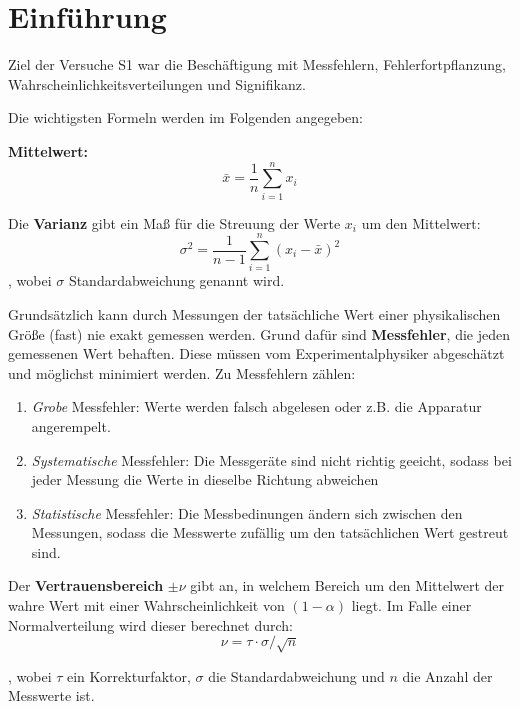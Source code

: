 \section{Einführung}

Ziel der Versuche S1 war die Beschäftigung mit Messfehlern, Fehlerfortpflanzung, Wahrscheinlichkeitsverteilungen und Signifikanz.

Die wichtigsten Formeln werden im Folgenden angegeben:

\textbf{Mittelwert:}
\begin{equation}
  \bar{x}=\frac{1}{n} \sum_{i=1}^n x_i
  \label{mwert}
\end{equation}

Die \textbf{Varianz} gibt ein Maß für die Streuung der Werte $x_i$ um den Mittelwert:
\begin{equation}
  \sigma^2=\frac{1}{n-1} \sum_{i=1}^n (x_i-\bar{x})^2
  \label{varianz}
\end{equation}
, wobei $\sigma$ Standardabweichung genannt wird.

Grundsätzlich kann durch Messungen der tatsächliche Wert einer physikalischen Größe (fast) nie exakt gemessen werden. Grund dafür sind \textbf{Messfehler}, die jeden gemessenen Wert behaften. Diese müssen vom Experimentalphysiker abgeschätzt und möglichst minimiert werden. Zu Messfehlern zählen:
\begin{enumerate}
  \item \emph{Grobe} Messfehler: Werte werden falsch abgelesen oder z.B. die Apparatur angerempelt.
  \item \emph{Systematische} Messfehler: Die Messgeräte sind nicht richtig geeicht, sodass bei jeder Messung die Werte in dieselbe Richtung abweichen
  \item \emph{Statistische} Messfehler: Die Messbedinungen ändern sich zwischen den Messungen, sodass die Messwerte zufällig um den tatsächlichen Wert gestreut sind.
\end{enumerate}

Der \textbf{Vertrauensbereich} $\pm\nu$ gibt an, in welchem Bereich um den Mittelwert der wahre Wert mit einer Wahrscheinlichkeit von $(1-\alpha)$ liegt. Im Falle einer Normalverteilung wird dieser berechnet durch:
\begin{equation}
  \nu = \tau \cdot \sigma / \sqrt{n}
  \label{vbereich}
\end{equation}

, wobei $\tau$ ein Korrekturfaktor, $\sigma$ die Standardabweichung und $n$ die Anzahl der Messwerte ist.

